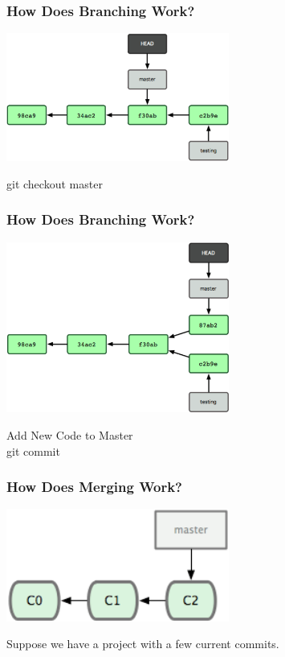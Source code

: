\begin{frame}
\frametitle{\large How Does Branching Work?}
\begin{center}
\includegraphics[width=0.55\textwidth]{img/branching_images/fig8.png}
\end{center}
\vspace{2mm}
\begin{center}
git checkout master
\end{center}
\end{frame}

\begin{frame}
\frametitle{\large How Does Branching Work?}
\begin{center}
\includegraphics[width=0.55\textwidth]{img/branching_images/fig9.png}
\end{center}
\vspace{2mm}
\begin{center}
Add New Code to Master \\
git commit
\end{center}
\end{frame}

\begin{frame}
\frametitle{\large How Does Merging Work?}
\begin{center}
\includegraphics[width=0.55\textwidth]{img/branching_images/f1.png}
\end{center}
\vspace{2mm}
\begin{center}
Suppose we have a project with a few current commits.
\end{center}
\end{frame}

